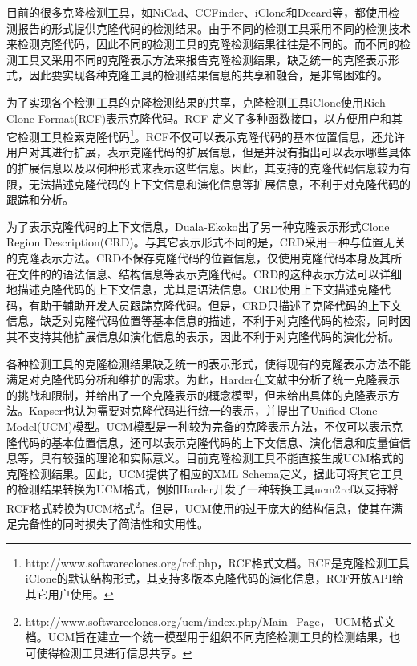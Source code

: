 目前的很多克隆检测工具，如NiCad、CCFinder、iClone和Decard等，都使用检测报告的形式提供克隆代码的检测结果。由于不同的检测工具采用不同的检测技术来检测克隆代码，因此不同的检测工具的克隆检测结果往往是不同的。而不同的检测工具又采用不同的克隆表示方法来报告克隆检测结果，缺乏统一的克隆表示形式，因此要实现各种克隆工具的检测结果信息的共享和融合，是非常困难的。

为了实现各个检测工具的克隆检测结果的共享，克隆检测工具iClone使用Rich Clone Format(RCF)表示克隆代码\cite{harder2011efficiently}。RCF 定义了多种函数接口，以方便用户和其它检测工具检索克隆代码\footnote{http://www.softwareclones.org/rcf.php，RCF格式文档。RCF是克隆检测工具iClone的默认结构形式，其支持多版本克隆代码的演化信息，RCF开放API给其它用户使用。}。RCF不仅可以表示克隆代码的基本位置信息，还允许用户对其进行扩展，表示克隆代码的扩展信息，但是并没有指出可以表示哪些具体的扩展信息以及以何种形式来表示这些信息。因此，其支持的克隆代码信息较为有限，无法描述克隆代码的上下文信息和演化信息等扩展信息，不利于对克隆代码的跟踪和分析。

为了表示克隆代码的上下文信息，Duala-Ekoko出了另一种克隆表示形式Clone Region Description(CRD)\cite{duala2010clone}。与其它表示形式不同的是，CRD采用一种与位置无关的克隆表示方法。CRD不保存克隆代码的位置信息，仅使用克隆代码本身及其所在文件的的语法信息、结构信息等表示克隆代码。CRD的这种表示方法可以详细地描述克隆代码的上下文信息，尤其是语法信息。CRD使用上下文描述克隆代码，有助于辅助开发人员跟踪克隆代码。但是，CRD只描述了克隆代码的上下文信息，缺乏对克隆代码位置等基本信息的描述，不利于对克隆代码的检索，同时因其不支持其他扩展信息如演化信息的表示，因此不利于对克隆代码的演化分析。

各种检测工具的克隆检测结果缺乏统一的表示形式，使得现有的克隆表示方法不能满足对克隆代码分析和维护的需求。为此，Harder在文献\cite{harder2013limits}中分析了统一克隆表示的挑战和限制，并给出了一个克隆表示的概念模型，但未给出具体的克隆表示方法。Kapser也认为需要对克隆代码进行统一的表示，并提出了Unified Clone Model(UCM)模型\cite{kapser2012common}。UCM模型是一种较为完备的克隆表示方法，不仅可以表示克隆代码的基本位置信息，还可以表示克隆代码的上下文信息、演化信息和度量值信息等，具有较强的理论和实际意义。目前克隆检测工具不能直接生成UCM格式的克隆检测结果。因此，UCM提供了相应的XML Schema定义，据此可将其它工具的检测结果转换为UCM格式，例如Harder开发了一种转换工具ucm2rcf以支持将RCF格式转换为UCM格式\footnote{http://www.softwareclones.org/ucm/index.php/Main\_Page， UCM格式文档。UCM旨在建立一个统一模型用于组织不同克隆检测工具的检测结果，也可使得检测工具进行信息共享。}。但是，UCM使用的过于庞大的结构信息，使其在满足完备性的同时损失了简洁性和实用性。

